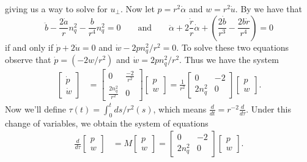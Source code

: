 \documentclass[11pt]{article}
\begin{document}
giving us a way to solve for $u_\perp$. Now let $p = r^2\dot \alpha$ and $w = r^2\dot u$. By  we have that
\begin{equation*} 
    \ddot b - \frac{2\dot a}{r}n_q^2 - \frac{b}{r^4} n_q^2 = 0 \qquad \text{and} \qquad \ddot \alpha +  2\frac{\dot r}{r}\dot \alpha + \left(\frac{2\dot b}{r^3} - \frac{ 2b\dot r}{r^4}\right) = 0
\end{equation*}
if and only if $\dot p + 2\dot u = 0$ and $\dot w - 2pn_q^2/r^2 = 0$.
To solve these two equations observe that $\dot p = (-2w/r^2)$ and $\dot w = 2pn_q^2/r^2$. Thus we have the system
\begin{align*}
    \begin{bmatrix}
        \dot p \\ \dot w
    \end{bmatrix} &=  
    \begin{bmatrix}
        0 & \frac{-2}{r^2} \\
        \frac{2n_q^2}{r^2} & 0 
    \end{bmatrix}
    \begin{bmatrix}
        p \\
        w
    \end{bmatrix} 
    = \frac{1}{r^2}
    \begin{bmatrix}
        0 & -2  \\
        2n_q^2 & 0 
    \end{bmatrix}
    \begin{bmatrix}
        p \\
        w
    \end{bmatrix}.
\end{align*}
Now we'll define $\tau(t) = \int_0^tds/r^2(s)$, which means $\frac{d}{dt} = r^{-2}\frac{d}{d\tau}$. Under this change of variables, we obtain the system of equations
\begin{align*}
    \frac{d}{d\tau}
    \begin{bmatrix}
        p \\ w
    \end{bmatrix} 
    &= M\begin{bmatrix}
        p \\
        w
    \end{bmatrix} =  \begin{bmatrix}
        0 & -2  \\
        2n_q^2 & 0 
    \end{bmatrix}
    \begin{bmatrix}
        p \\
        w
    \end{bmatrix}.
\end{align*}
\end{document}

